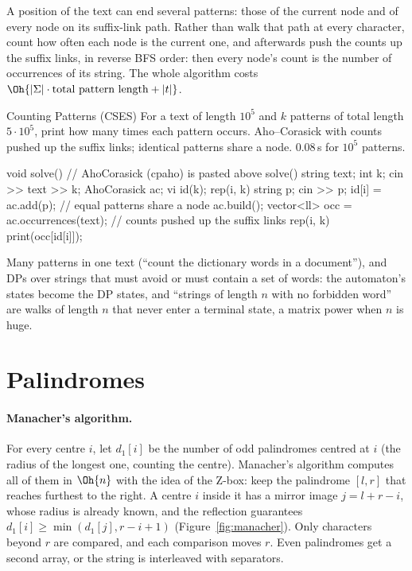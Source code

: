 A position of the text can end several patterns: those of the current node and of every node on its suffix-link path. Rather than walk
that path at every character, count how often each node is the current one, and afterwards push the counts up the suffix links, in
reverse BFS order: then every node's count is the number of occurrences of its string. The whole algorithm costs $\Oh{|\Sigma| \cdot
\text{total pattern length} + |t|}$.


\begin{problem}{Counting Patterns (CSES)}
For a text of length $10^5$ and $k$ patterns of total length $5 \cdot 10^5$, print how many times each pattern occurs.
\solution Aho--Corasick with counts pushed up the suffix links; identical patterns share a node. 0.08\,s for $10^5$ patterns.
\end{problem}

\begin{code}
void solve() {  // AhoCorasick (cpaho) is pasted above solve()
    string text;
    int k;
    cin >> text >> k;
    AhoCorasick ac;
    vi id(k);
    rep(i, k) {
        string p;
        cin >> p;
        id[i] = ac.add(p);  // equal patterns share a node
    }
    ac.build();
    vector<ll> occ = ac.occurrences(text);  // counts pushed up the suffix links
    rep(i, k) print(occ[id[i]]);
}
\end{code}

\begin{recognize}
Many patterns in one text (``count the dictionary words in a document''), and DPs over strings that must avoid or must contain a set of
words: the automaton's states become the DP states, and ``strings of length $n$ with no forbidden word'' are walks of length $n$ that
never enter a terminal state, a matrix power when $n$ is huge.
\end{recognize}

\section[Palindromes]{Palindromes \hfill \plat}\label{sec:palindromes}

\paragraph{Manacher's algorithm.} For every centre $i$, let $d_1[i]$ be the number of odd palindromes centred at $i$ (the radius of the
longest one, counting the centre). Manacher's algorithm computes all of them in $\Oh{n}$ with the idea of the Z-box: keep the palindrome
$[l, r]$ that reaches furthest to the right. A centre $i$ inside it has a mirror image $j = l + r - i$, whose radius is already known, and
the reflection guarantees $d_1[i] \ge \min(d_1[j], r - i + 1)$ (Figure~\ref{fig:manacher}). Only characters beyond $r$ are compared, and
each comparison moves $r$. Even palindromes get a second array, or the string is interleaved with separators.

